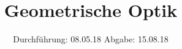 

\subject{408}
\title{Geometrische Optik}
\date{%
  Durchführung: 08.05.18
  \hspace{3em}
  Abgabe: 15.08.18
}



\maketitle
\thispagestyle{empty}
\tableofcontents
\newpage







\printbibliography{}


